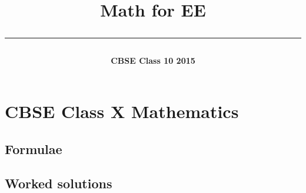 \documentclass[journal]{IEEEtran}
\begin{document}

\onecolumn

\title{
  \begin{center}
  {\LARGE\bfseries Math for EE}\\
  \rule{0.4\columnwidth}{0.4pt}
  \end{center}
}
\author{
  \vspace{11cm}
  \begin{center}
  {\fontsize{26}{31}\selectfont\bfseries CBSE Class 10 2015}
  \end{center}
}
\maketitle
\thispagestyle{empty}
\newpage
\tableofcontents
\newpage

\section{CBSE Class X Mathematics}
\subsection{Formulae}

\newpage
\subsection{Worked solutions}

\end{document}
